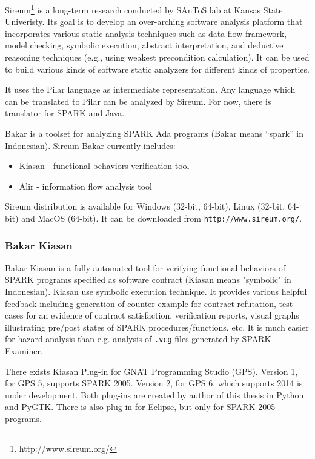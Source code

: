 Sireum\footnote{http://www.sireum.org/} is a long-term research conducted by SAnToS lab at Kansas State Univeristy. Its goal is to develop an over-arching software analysis platform that incorporates various static analysis techniques such as data-flow framework, model checking, symbolic execution, abstract interpretation, and deductive reasoning techniques (e.g., using weakest precondition calculation). It can be used to build various kinds of software static analyzers for different kinds of properties. 

It uses the Pilar language \cite{Pilar:Paper} as intermediate representation. Any language which can be translated to Pilar can be analyzed by Sireum. For now, there is translator for SPARK and Java.

Bakar is a toolset for analyzing SPARK Ada programs (Bakar means “spark” in Indonesian). Sireum Bakar currently includes:
\begin{itemize}
	\item Kiasan - functional behaviors verification tool
	\item Alir - information flow analysis tool	
\end{itemize}

Sireum distribution is available for Windows (32-bit, 64-bit), Linux (32-bit, 64-bit) and MacOS (64-bit). It can be downloaded from \lstinline{http://www.sireum.org/}.


\subsubsection{Bakar Kiasan}

Bakar Kiasan \cite{Kiasan:Paper} is a fully automated tool for verifying functional behaviors of SPARK programs specified as software contract (Kiasan means "symbolic" in Indonesian). Kiasan use symbolic execution technique. It provides various helpful feedback including generation of counter example for contract refutation, test cases for an evidence of contract satisfaction, verification reports, visual graphs illustrating pre/post states of SPARK procedures/functions, etc. It is much easier for hazard analysis than e.g. analysis of \lstinline{.vcg} files generated by SPARK Examiner.

There exists Kiasan Plug-in for GNAT Programming Studio (GPS). Version 1, for GPS 5, supports SPARK 2005. Version 2, for GPS 6, which supports 2014 is under development. Both plug-ins are created by author of this thesis in Python and PyGTK. There is also plug-in for Eclipse, but only for SPARK 2005 programs.


